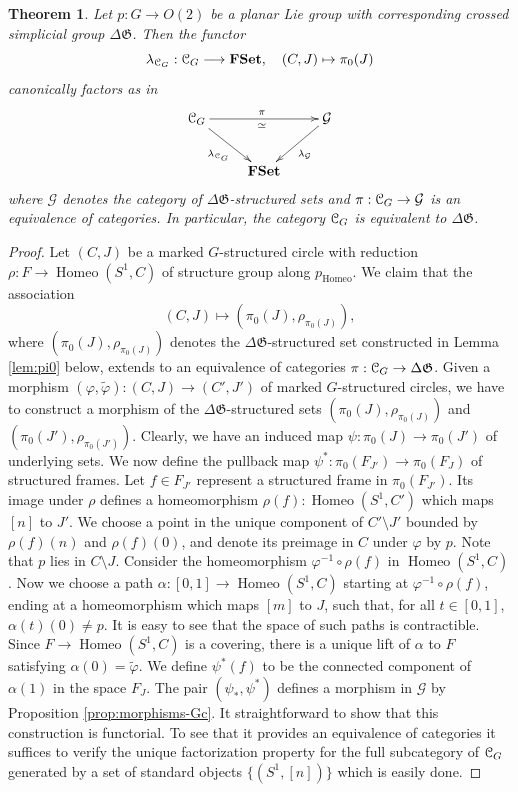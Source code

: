 \documentclass[english,11pt,leqno]{article}
\def\Gen{\mathfrak{G}}
\def\Gc{\mathcal{G}}
\def\on{\operatorname}
\def\lra{\longrightarrow}
\def\G{ {\mathcal G}}
\def\DG{ {\Delta \Gen}}
\def\CG{{ {\EuScript C}_G}}
\def\Homeo{{ \on{Homeo}}}
\def\FSet{{\bf FSet}}
\newtheorem{thm}{Theorem}[section]
\theoremstyle{definition}
\theoremstyle{remark}
\numberwithin{equation}{section}
\begin{document}
\begin{thm}\label{thm:CG=DG}
	Let $p: G \to O(2)$ be a planar Lie group with corresponding crossed simplicial group $\DG$. Then
	the functor
	\[
		\lambda_{\CG}: \CG \lra \FSet, \quad (C,J)\mapsto \pi_0(J)
	\]
	canonically factors as in 
	\[
		\xymatrix{
			\CG \ar[dr]_{\lambda_{\CG}} \ar[rr]^{\pi}_{\simeq} & & \G \ar[dl]^{\lambda_{\G}} \\
		& \FSet & }
	\]
	where $\G$ denotes the category of $\DG$-structured sets and $\pi: \CG \to \G$ is an equivalence
	of categories. In particular, the category $\CG$ is equivalent to $\DG$. 
\end{thm}
\begin{proof} 
	Let $(C,J)$ be a marked $G$-structured circle with reduction $\rho: F \to \Homeo(S^1, C)$ of structure
	group along $p_\Homeo$. We claim that the association
	\[
		(C,J) \mapsto (\pi_0(J), \rho_{\pi_0(J)}),
	\] 
	where $(\pi_0(J), \rho_{\pi_0(J)})$ denotes the $\DG$-structured set constructed in Lemma
	\ref{lem:pi0} below, extends to an equivalence of categories $\pi: \CG \to \DG$.
	Given a morphism $(\varphi, \widetilde{\varphi}): (C,J) \to (C', J')$ of marked
	$G$-structured circles, we have to construct a morphism of the $\DG$-structured sets
	$(\pi_0(J), \rho_{\pi_0(J)})$ and $(\pi_0(J'),\rho_{\pi_0(J')})$. Clearly, we have an
	induced map $\psi: \pi_0(J) \to \pi_0(J')$ of underlying sets. We now define the pullback
	map $\psi^*: \pi_0(F_{J'}) \to \pi_0(F_{J})$ of structured frames. Let $f \in F_{J'}$
	represent a structured frame in $\pi_0(F_{J'})$. Its image under $\rho$ defines a
	homeomorphism  $\rho(f): \Homeo(S^1, C')$ which maps $[n]$ to $J'$. We choose a point in the
	unique component of $C'\setminus J'$ bounded by $\rho(f)(n)$ and $\rho(f)(0)$, and denote
	its preimage in $C$ under $\varphi$ by $p$. Note that $p$ lies in $C \setminus J$.  Consider
	the homeomorphism $\varphi^{-1} \circ \rho(f)$ in $\Homeo(S^1, C)$. Now we choose a path
	$\alpha: [0,1] \to \Homeo(S^1, C)$ starting at $\varphi^{-1} \circ \rho(f)$, ending at a
	homeomorphism which maps $[m]$ to $J$, such that, for all $t \in [0,1]$, $\alpha(t)(0) \ne
	p$. It is easy to see that the space of such paths is contractible. Since $F \to \Homeo(S^1,
	C)$ is a covering, there is a unique lift of $\alpha$ to $F$ satisfying $\alpha(0) =
	\widetilde{\varphi}$. We define $\psi^*(f)$ to be the connected component of $\alpha(1)$ in
	the space $F_J$.  The pair $(\psi_*, \psi^*)$ defines a morphism in $\Gc$ by Proposition
	\ref{prop:morphisms-Gc}. It straightforward to show that this construction is functorial. 
	To see that it provides an equivalence of categories it suffices to verify the unique
	factorization property for the full subcategory of $\CG$ generated by a set of standard
	objects $\{ (S^1, [n]) \}$ which is easily done.
\end{proof}
\end{document}
